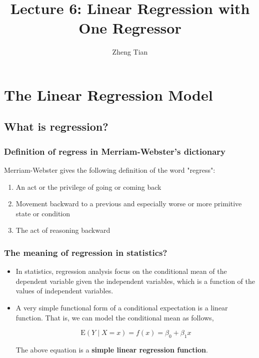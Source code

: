 \documentclass[11pt]{article}
\author{Zheng Tian}
\date{}
\title{Lecture 6: Linear Regression with One Regressor}
\begin{document}
\maketitle
\setcounter{tocdepth}{1}
\tableofcontents



\section*{The Linear Regression Model}
\label{sec:org058974b}

\subsection*{What is regression?}
\label{sec:org55e4367}

\subsubsection*{Definition of \textbf{regress} in Merriam-Webster's dictionary}
\label{sec:org594ac17}

Merriam-Webster gives the following definition of the word "regress":
\begin{enumerate}
\item An act or the privilege of going or coming back
\item Movement backward to a previous and especially worse or more
primitive state or condition
\item The act of reasoning backward
\end{enumerate}

\subsubsection*{The meaning of regression in statistics?}
\label{sec:orge39e018}

\begin{itemize}
\item In statistics, regression analysis focus on the conditional mean of the
dependent variable given the independent variables, which is a
function of the values of independent variables.

\item A very simple functional form of a conditional expectation is a linear
function. That is, we can model the conditional mean as follows,

\begin{equation}
\label{eq:genpopreg}
\mathrm{E}(Y \mid X = x) = f(x) = \beta_{0} + \beta_1 x
\end{equation}

The above equation is a \textbf{simple linear regression function}.
\end{itemize}
\end{document}
